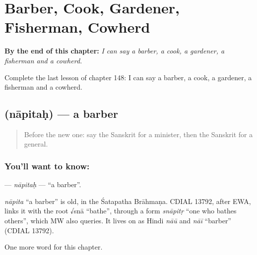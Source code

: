 
\chapter{Barber, Cook, Gardener, Fisherman, Cowherd}
\label{ch:sa-barber-cook-gardener-fisherman-cowherd}

\begin{chapteropening}
\textbf{By the end of this chapter:} \emph{I can say a barber, a cook, a gardener, a fisherman and a cowherd.}

Complete the last lesson of chapter 148: I can say a barber, a cook, a gardener, a fisherman and a cowherd.
\end{chapteropening}

\section[\texorpdfstring{\sk{नापितः} (nāpitaḥ)}{नापितः (nāpitaḥ)}]{ (nāpitaḥ) — a barber}

\label{lesson:SA-C148-napitah}



\begin{quote}
Before the new one: say the Sanskrit for a minister, then the Sanskrit for a general.
\end{quote}

\subsection*{You'll want to know: }
\textbf{} — \emph{nāpitaḥ} — \textquotedblleft{}a barber\textquotedblright{}.

\begin{cousinweb}
\emph{nāpita} \textquotedblleft{}a barber\textquotedblright{} is old, in the Śatapatha Brāhmaṇa. CDIAL 13792, after EWA, links it with the root √snā \textquotedblleft{}bathe\textquotedblright{}, through a form \emph{snāpitṛ} \textquotedblleft{}one who bathes others\textquotedblright{}, which MW also queries. It lives on as Hindi \emph{nāū} and \emph{nāī} \textquotedblleft{}barber\textquotedblright{} (CDIAL 13792).
\end{cousinweb}

\begin{grammarlens}[title={What you've built}]
One more word for this chapter.
\end{grammarlens}

